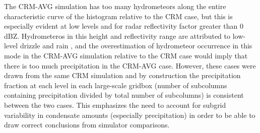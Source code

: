 \documentclass[letter]{article}
\begin{document}
The CRM-AVG simulation has too many hydrometeors along the entire characteristic curve of the histogram relative to the CRM case, but this is especially evident at low levels and for radar reflectivity factor greater than $0$ dBZ. Hydrometeros in this height and reflectivity range are attributed to low-level drizzle and rain \citep{marchand_et_al_2009}, and the overestimation of hydrometeor occurrence in this mode in the CRM-AVG simulation relative to the CRM case would imply that there is too much precipitation in the CRM-AVG case. However, these cases were drawn from the same CRM simulation and by construction the precipitation fraction at each level in each large-scale gridbox (number of subcolumns containing precipitation divided by total number of subcolumns) is consistent between the two cases. This emphasizes the need to account for subgrid variability in condensate amounts (especially precipitation) in order to be able to draw correct conclusions from simulator comparisons.
\end{document}
